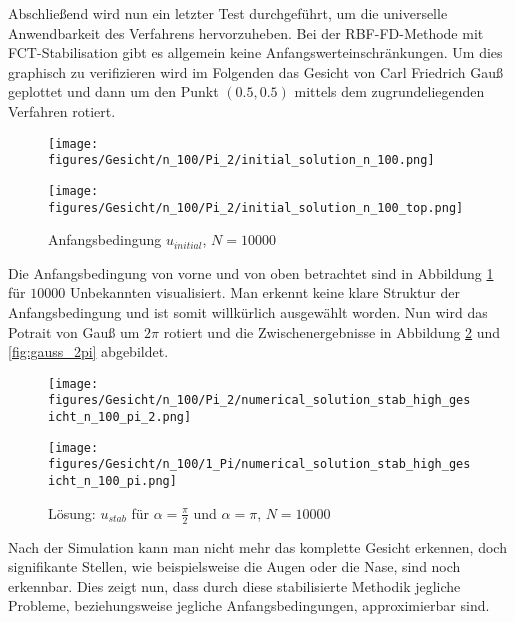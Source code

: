 \documentclass[12pt,titlepage]{article}
\begin{document}
Abschließend wird nun ein letzter Test durchgeführt, um die universelle Anwendbarkeit des Verfahrens hervorzuheben. Bei der RBF-FD-Methode mit FCT-Stabilisation gibt es allgemein keine Anfangswerteinschränkungen. Um dies graphisch zu verifizieren wird im Folgenden das Gesicht von Carl Friedrich Gauß geplottet und dann um den Punkt $(0.5,0.5)$ mittels dem zugrundeliegenden Verfahren rotiert.
\begin{figure}[H]
\begin{minipage}{0.4\textwidth}
\texttt{[image: figures/Gesicht/n\_100/Pi\_2/initial\_solution\_n\_100.png]}
\end{minipage}
\hspace{1.4cm}
\begin{minipage}{0.4\textwidth}
\texttt{[image: figures/Gesicht/n\_100/Pi\_2/initial\_solution\_n\_100\_top.png]}
\end{minipage}
\caption{Anfangsbedingung $u_{initial}$, $N=10000$}
\label{fig:init_gauss}
\end{figure}
\noindent
Die Anfangsbedingung von vorne und von oben betrachtet sind in Abbildung \ref{fig:init_gauss} für $10000$ Unbekannten visualisiert. Man erkennt keine klare Struktur der Anfangsbedingung und ist somit willkürlich ausgewählt worden. Nun wird das Potrait von Gauß um $2\pi$ rotiert und die Zwischenergebnisse in Abbildung \ref{fig:gauss_pi} und \ref{fig:gauss_2pi} abgebildet.
\begin{figure}[H]
\begin{minipage}{0.4\textwidth}
 \texttt{[image: figures/Gesicht/n\_100/Pi\_2/numerical\_solution\_stab\_high\_gesicht\_n\_100\_pi\_2.png]}
\vspace{-0.4cm}
\end{minipage}
\hspace{1.4cm}
\begin{minipage}{0.4\textwidth}
 \texttt{[image: figures/Gesicht/n\_100/1\_Pi/numerical\_solution\_stab\_high\_gesicht\_n\_100\_pi.png]}
\vspace{-0.4cm}
\end{minipage}
\caption{Lösung: $u_{stab}$ für $\alpha=\frac{\pi}{2}$ und $\alpha=\pi$, $N=10000$}
\label{fig:gauss_pi}
\end{figure}
\noindent
Nach der Simulation kann man nicht mehr das komplette Gesicht erkennen, doch signifikante Stellen, wie beispielsweise die Augen oder die Nase, sind noch erkennbar. Dies zeigt nun, dass durch diese stabilisierte Methodik jegliche Probleme, beziehungsweise jegliche Anfangsbedingungen, approximierbar sind.
\end{document}
